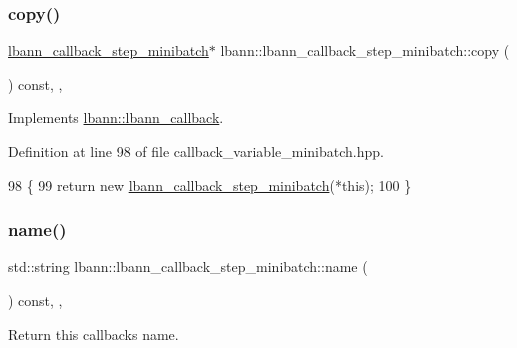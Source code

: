 \subsubsection{\texorpdfstring{copy()}{copy()}}
{\footnotesize\ttfamily \hyperlink{classlbann_1_1lbann__callback__step__minibatch}{lbann\+\_\+callback\+\_\+step\+\_\+minibatch}$\ast$ lbann\+::lbann\+\_\+callback\+\_\+step\+\_\+minibatch\+::copy (\begin{DoxyParamCaption}{ }\end{DoxyParamCaption}) const\hspace{0.3cm}{\ttfamily [inline]}, {\ttfamily [override]}, {\ttfamily [virtual]}}



Implements \hyperlink{classlbann_1_1lbann__callback_a9f545d1269a8c7af335625d049691f26}{lbann\+::lbann\+\_\+callback}.



Definition at line 98 of file callback\+\_\+variable\+\_\+minibatch.\+hpp.


\begin{DoxyCode}
98                                                        \{
99     \textcolor{keywordflow}{return} \textcolor{keyword}{new} \hyperlink{classlbann_1_1lbann__callback__step__minibatch_a2ce11bed6c3a4d526c2fdd885970f49d}{lbann\_callback\_step\_minibatch}(*\textcolor{keyword}{this});
100   \}
\end{DoxyCode}
\mbox{\label{classlbann_1_1lbann__callback__step__minibatch_a2e07fa5a590d68b1b71059d9275ee12a}} 
\subsubsection{\texorpdfstring{name()}{name()}}
{\footnotesize\ttfamily std\+::string lbann\+::lbann\+\_\+callback\+\_\+step\+\_\+minibatch\+::name (\begin{DoxyParamCaption}{ }\end{DoxyParamCaption}) const\hspace{0.3cm}{\ttfamily [inline]}, {\ttfamily [override]}, {\ttfamily [virtual]}}

Return this callback\textquotesingle{}s name. 

